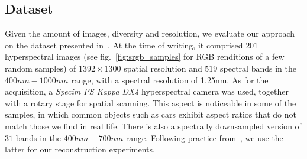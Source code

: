 \documentclass{bmvc2k}
\begin{document}
\subsection{Dataset}
Given the amount of images, diversity and resolution, we evaluate our approach on the dataset presented in~\cite{arad_sparse_2016}. 
At the time of writing, it comprised $201$ hyperspectral images (see fig.~\ref{fig:srgb_samples} for RGB renditions of a few random samples) of $1392\times1300$ spatial resolution and $519$ spectral bands in the $400nm-1000nm$ range, with a spectral resolution of 1.25nm. 
As for the acquisition, a \emph{Specim PS Kappa DX4} hyperspectral camera was used, together with a rotary stage for spatial scanning.
This aspect is noticeable in some of the samples, in which common objects such as cars exhibit aspect ratios that do not match those we find in real life.
There is also a spectrally downsampled version of $31$ bands in the $400nm-700nm$ range. Following practice from~\cite{arad_sparse_2016}, we use the latter for our reconstruction experiments.

\end{document}
